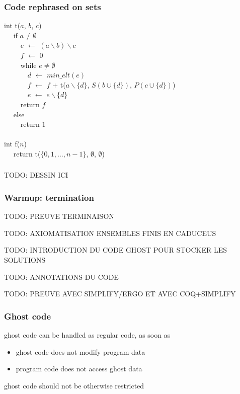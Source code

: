 \documentclass[compress]{beamer}
\newcommand{\kw}[1]{{\color{blue}#1}}
\newcommand{\minelt}[1]{\ensuremath{\mathit{min\_elt}(#1)}}
\begin{document}
\begin{frame}
  \frametitle{Code rephrased on sets}
{\tt\begin{obeylines}
  \kw{int} t($a$, $b$, $c$) \\
  ~~ \kw{if} $a \not= \emptyset$ \\
  ~~~~ $e$ $\leftarrow$ $(a \backslash  b) \backslash c$ \\
  ~~~~ $f$ $\leftarrow$ 0 \\
  ~~~~ \kw{while} $e \not=\emptyset$ \\
  ~~~~~~ $d$ $\leftarrow$ $\minelt{e}$ \\
  ~~~~~~ $f$ $\leftarrow$ $f$ $+$ t($a\backslash \{d\}$, $S(b\cup\{d\})$, $P(c\cup\{d\})$) \\
  ~~~~~~ $e$ $\leftarrow$ $e \backslash  \{d\}$ \\
  ~~~~ \kw{return} $f$ \\
  ~~ \kw{else} \\
  ~~~~ \kw{return} $1$ \\
  ~~ \\
  \kw{int} f($n$) \\
  ~~ \kw{return} t($\{0,1,\dots,n-1\}$, $\emptyset$, $\emptyset$)
\end{obeylines}}
\end{frame}

\begin{frame}
  \frametitle{}
  TODO: DESSIN ICI
\end{frame}

\begin{frame}
  \frametitle{Warmup: termination}
  TODO: PREUVE TERMINAISON
\end{frame}

\begin{frame}
  TODO: AXIOMATISATION ENSEMBLES FINIS EN CADUCEUS
\end{frame}

\begin{frame}
  TODO: INTRODUCTION DU CODE GHOST POUR STOCKER LES SOLUTIONS
\end{frame}

\begin{frame}
  TODO: ANNOTATIONS DU CODE
\end{frame}

\begin{frame}
  TODO: PREUVE AVEC SIMPLIFY/ERGO ET AVEC COQ+SIMPLIFY
\end{frame}

\begin{frame}
  \frametitle{Ghost code}
  
  ghost code can be handled as regular code, as soon as
  \begin{itemize}
  \item ghost code does not modify program data
  \item program code does not access ghost data
  \end{itemize}

  ghost code should not be otherwise restricted
\end{frame}
\end{document}
